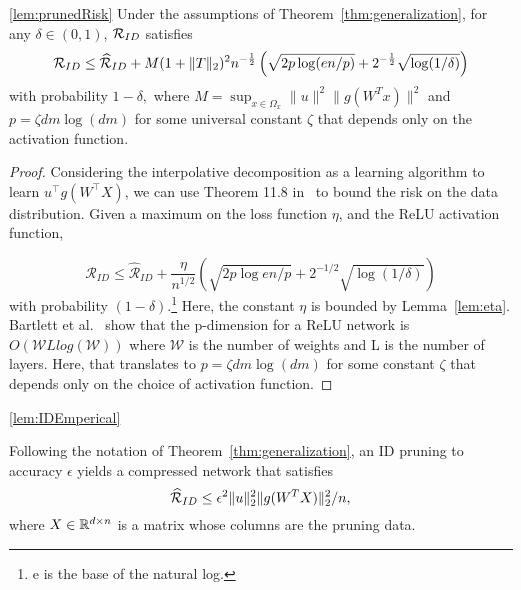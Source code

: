\begin{customlemma}{\ref{lem:prunedRisk}}
Under the assumptions of Theorem~\ref{thm:generalization}, for any $\delta\in(0,1)$, $\mathcal{R}_{ID}$ satisfies  
\begin{equation*}
    \mathcal{R}_{ID} \leq \widehat{\mathcal{R}}_{ID} + M(1+\|T\|_2)^2n^{-\frac{1}{2}}\left( \sqrt{2p\log(en/p)}+ 2^{-\frac{1}{2}}\sqrt{\log (1/\delta)}\right)
\end{equation*}
with probability $1-\delta,$ where $M = \sup_{x\in\Omega_x} \|u\| ^2 \| g(W^T x)\|^2$ and $p=\zeta dm \log (dm)$ for some universal constant $\zeta$ that depends only on the activation function.
\end{customlemma}
\begin{proof} 
Considering the interpolative decomposition as a learning algorithm to learn $u^\top g(W^\top X)$, we can use Theorem 11.8 in~\cite{foundationsML} to bound the risk on the data distribution. Given a maximum on the loss function $\eta$, and the ReLU activation function, 


\begin{equation*}
    \mathcal{R}_{ID} \leq \widehat{\mathcal{R}}_{ID} + \frac{\eta}{n^{1/2}}( \sqrt{2p\log en/p}+ 2^{-1/2} \sqrt{\log (1/\delta)})
\end{equation*}
with probability $(1-\delta)$.\footnote{e is the base of the natural log.} Here, the constant $\eta$ is bounded by Lemma~\ref{lem:eta}. Bartlett et al.~\cite{pmlr-v65-harvey17a}  show that the p-dimension for a ReLU network is $O(\mathcal{W}Llog(\mathcal{W}))$ where $\mathcal{W}$ is the number of weights and L is the number of layers.   Here, that translates to $p=\zeta dm \log(dm)$ for some constant $\zeta$ that depends only on the choice of activation function.  
\end{proof}




\begin{customlemma}{\ref{lem:IDEmperical}}

Following the notation of Theorem~\ref{thm:generalization}, an ID pruning to accuracy $\epsilon$ yields a compressed network that satisfies
\begin{equation*}
    \widehat{\mathcal{R}}_{ID} \leq  \epsilon^2 \|u\|_2^2 \| g(W^T X)\|_2^2 / n,
\end{equation*}
where $X\in\mathbb{R}^{d\times n}$ is a matrix whose columns are the pruning data.
\end{customlemma}

